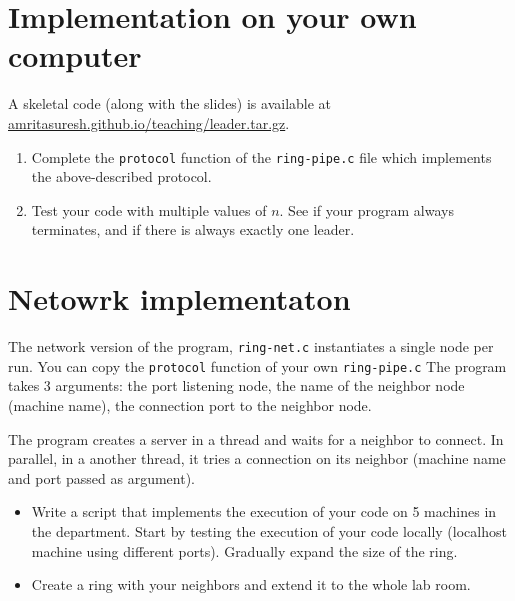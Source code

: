 \documentclass[11pt]{article}
\begin{document}
\section{Implementation on your own computer}

A skeletal code (along with the slides) is available at \url{amritasuresh.github.io/teaching/leader.tar.gz}.
\begin{enumerate}
	\item Complete the \texttt{protocol} function of the \texttt{ring-pipe.c} file which implements the above-described protocol.
	\item Test your code with multiple values of $n$. See if your program always terminates, and if there is always exactly one leader.
\end{enumerate}


\section{Netowrk implementaton}
The network version of the program, \texttt{ring-net.c} instantiates a single node per run. You can
copy the \texttt{protocol} function of your own \texttt{ring-pipe.c}  The program takes 3 arguments: the port
listening node, the name of the neighbor node (machine name), the connection port to the neighbor node. 

The program creates a server in a thread and waits for a neighbor to connect. In parallel, in a
another thread, it tries a connection on its neighbor (machine name and port passed as argument).
\begin{itemize}
	\item Write a script that implements the execution of your code on 5 machines in the department. Start by testing the execution of your code locally (localhost machine using different
	ports). Gradually expand the size of the ring.
	\item Create a ring with your neighbors and extend it to the whole lab room.
\end{itemize}
\end{document}
